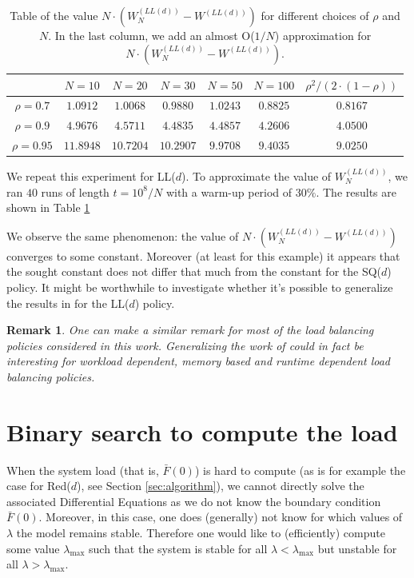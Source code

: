 \documentclass[12pt]{report}
\newtheorem{remark}{Remark}
\begin{document}
\begin{table}[h!]
	\centering
	\begin{tabular}{||c c c c c c c||} 
		\hline
		& $N=10$ & $N=20$ & $N=30$ & $N=50$ & $N=100$ & $\rho^2/(2\cdot (1-\rho))$ \\
		\hline\hline
		$\rho = 0.7$ & $1.0912$ &  $1.0068$ &    $0.9880$ &    $1.0243$ &    $0.8825$ & $0.8167$\\
		$\rho = 0.9$  &  $4.9676$ &    $4.5711$ &    $4.4835$ &    $4.4857$ &    $4.2606$ & $4.0500$ \\
		$\rho = 0.95$ &  $11.8948$ &    $10.7204$ &    $10.2907$ &    $9.9708$ &    $9.4035$ & $9.0250$ \\ [1ex] 
		\hline
	\end{tabular}
	\caption{Table of the value $N\cdot (W_{N}^{(LL(d))}-W^{(LL(d))})$ for different choices of $\rho$ and $N$. In the last column, we add an almost O($1/N$) approximation for $N\cdot (W_{N}^{(LL(d))}-W^{(LL(d))})$.}
	\label{table:refined_LLd}
\end{table}
We repeat this experiment for LL($d$). To approximate the value of $W_{N}^{(LL(d))}$, we ran $40$ runs of length $t=10^8/N$ with a warm-up period of $30\%$. The results are shown in Table \ref{table:refined_LLd}

We observe the same phenomenon: the value of $N\cdot (W_{N}^{(LL(d))}-W^{(LL(d))})$ converges to some constant. Moreover (at least for this example) it appears that the sought constant does not differ that much from the constant for the SQ($d$) policy. It might be worthwhile to investigate whether it's possible to generalize the results in \cite{gast_refined} for the LL($d$) policy.

\begin{remark}
One can make a similar remark for most of the load balancing policies considered in this work. Generalizing the work of \cite{gast_refined} could in fact be interesting for workload dependent, memory based and runtime dependent load balancing policies.
\end{remark}

\section{Binary search to compute the load}\label{sec:open_binary_redd}
When the system load (that is, $\bar F(0)$) is hard to compute (as is for example the case for Red($d$), see Section \ref{sec:algorithm}), we cannot directly solve the associated Differential Equations as we do not know the boundary condition $\bar F(0)$. Moreover, in this case, one does (generally) not know for which values of $\lambda$ the model remains stable. Therefore one would like to (efficiently) compute some value $\lambda_{\max}$ such that the system is stable for all $\lambda < \lambda_{\max}$ but unstable for all $\lambda > \lambda_{\max}$.
\end{document}
